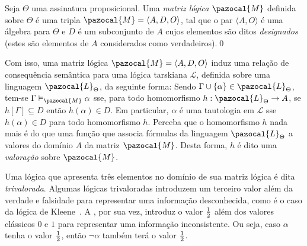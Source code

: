         \begin{definicao}
            Seja $\Theta$ uma assinatura proposicional. Uma \textit{matriz lógica} $\pazocal{M}$ definida sobre $\Theta$ é uma tripla $\pazocal{M} = \langle A, D, O \rangle$, tal que o par $\langle A, O \rangle$ é uma álgebra para $\Theta$ e $D$ é um subconjunto de $A$ cujos elementos são ditos \textit{designados} (estes são elementos de $A$ considerados como verdadeiros).\qed{}
        \end{definicao}

        Com isso, uma matriz lógica $\pazocal{M} = \langle A, D, O \rangle$ induz uma relação de consequência semântica para uma lógica tarskiana $\mathcal{L}$, definida sobre uma linguagem $\pazocal{L}_{\Theta}$, da seguinte forma: Sendo $\Gamma \cup \{\alpha\} \in \pazocal{L}_{\Theta}$, tem-se $\Gamma \vDash_{\pazocal{M}} \alpha$ sse, para todo homomorfismo $h : \pazocal{L}_{\Theta} \to A$, se $h[\Gamma] \subseteq D$ então $h(\alpha) \in D$. Em particular, $\alpha$ é uma tautologia em $\mathcal{L}$ sse $h(\alpha) \in D$ para todo homomorfismo $h$. Perceba que o homomorfismo $h$ nada mais é do que uma função que associa fórmulas da linguagem $\pazocal{L}_{\Theta}$ a valores do domínio $A$ da matriz $\pazocal{M}$. Desta forma, $h$ é dito uma \textit{valoração} sobre $\pazocal{M}$.


       Uma lógica que apresenta três elementos no domínio de sua matriz lógica é dita \textit{trivalorada}. Algumas lógicas trivaloradas introduzem um terceiro valor além da verdade e falsidade para representar uma informação desconhecida, como é o caso da lógica de Kleene~\cite{manyvalued}. A \lfium{}, por sua vez, introduz o valor $\frac{1}{2}{}$ além dos valores clássicos $0$ e $1$ para representar uma informação inconsistente. Ou seja, caso $\alpha$ tenha o valor $\frac{1}{2}{}$, então $\neg \alpha$ também terá o valor $\frac{1}{2}{}$.

